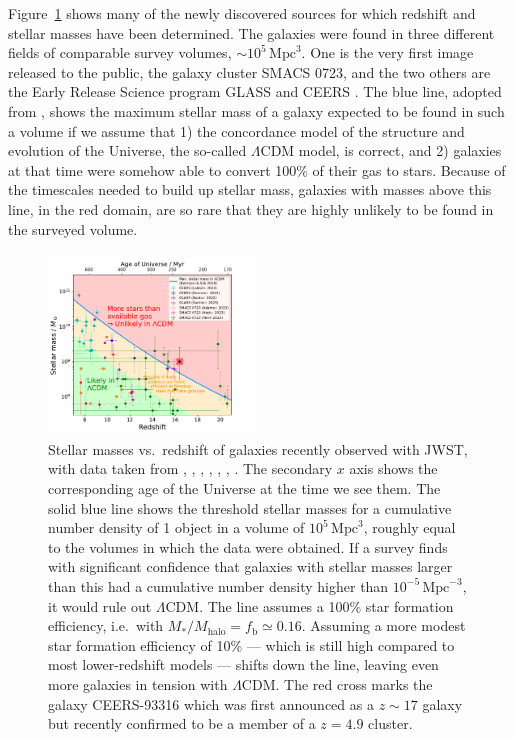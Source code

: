 \documentclass[useAMS]{aa}
\begin{document}
Figure~\ref{fig:jwst_stellar_mass_vs_redshift} shows many of the newly discovered sources for which redshift and stellar masses have been determined.
The galaxies were found in three different fields of comparable survey volumes, $\sim10^5\,\mathrm{Mpc}^3$.
One is the very first image released to the public, the galaxy cluster SMACS 0723, and the two others are the Early Release Science program GLASS \citep{Treu2022} and CEERS \citep{Finkelstein2023}.
The blue line, adopted from \citet{Behroozi2018}, shows the maximum stellar mass of a galaxy expected to be found in such a volume if we assume that
1) the concordance model of the structure and evolution of the Universe, the so-called $\Lambda$CDM model, is correct, and
2) galaxies at that time were somehow able to convert 100\% of their gas to stars.
Because of the timescales needed to build up stellar mass, galaxies with masses above this line, in the red domain, are so rare that they are highly unlikely to be found in the surveyed volume.
\begin{figure}[!t]
    \centering
    \includegraphics [width=0.48\textwidth] {jwst-stellar-mass-vs-redshift.pdf}
    \caption{Stellar masses vs.~redshift of galaxies recently observed with JWST, with data taken from
    \citet{Labbe2023},
    \citet{Donnan2023},
    \citet{Naidu2022},
    \citet{Santini2023},
    \citet{Adams2023},
    \citet{Atek2023},
    \citet{Yan2023}.
    The secondary $x$ axis shows the corresponding age of the Universe at the time we see them.
    The solid blue line shows the threshold stellar masses for a cumulative number density of 1 object in a volume of $10^5\,\mathrm{Mpc}^3$, roughly equal to the volumes in which the data were obtained.
    If a survey finds with significant confidence that galaxies with stellar masses larger than this had a cumulative number density higher than $10^{-5}\,\mathrm{Mpc}^{-3}$, it would rule out $\Lambda$CDM.
    The line assumes a 100\% star formation efficiency, i.e.~with $M_*/M_\mathrm{halo} = f_\mathrm{b} \simeq 0.16$.
    Assuming a more modest star formation efficiency of 10\% --- which is still high compared to most lower-redshift models --- shifts down the line, leaving even more galaxies in tension with $\Lambda$CDM.
    The red cross marks the galaxy CEERS-93316 which was first announced as a $z\sim17$ galaxy but recently confirmed to be a member of a $z=4.9$ cluster.}
    \label{fig:jwst_stellar_mass_vs_redshift}
\end{figure}
\end{document}
